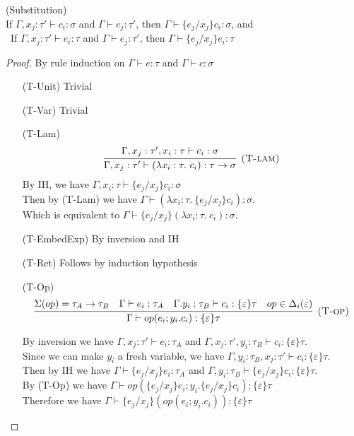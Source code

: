 \begin{lemma} (Substitution) \\
If $\Gamma, x_j : \tau' \vdash c_i : \sigma$ and $\Gamma \vdash e_j : \tau'$, then $\Gamma \vdash \{e_j/x_j\}c_i : \sigma$, and\\\
If $\Gamma, x_j : \tau' \vdash e_i : \tau $ and $\Gamma \vdash e_j : \tau'$, then $\Gamma \vdash \{e_j/x_j\}e_i : \tau$

\begin{proof}
By rule induction on $\Gamma \vdash e : \tau$ and $\Gamma \vdash c : \sigma$
\begin{enumerate}[align=left]
\item[(T-Unit)] Trivial
\item[(T-Var)] Trivial
\item[(T-Lam)] 
$$
\infer[\textsc{(T-lam)}]
  {\Gamma, x_j : \tau'  \vdash (\lambda x_i: \tau.\ c_i) : \tau \rightarrow \sigma}
  {\Gamma,x_j : \tau',  x_i:\tau \vdash c_i : \sigma} 
$$
By IH, we have $\Gamma, x_i:\tau \vdash \{e_j/x_j\}c_i : \sigma$\\
Then by (T-Lam) we have $\Gamma \vdash (\lambda x_i : \tau.\ \{e_j/x_j\}c_i) : \sigma$.\\
Which is equivalent to $\Gamma \vdash \{e_j/x_j\}(\lambda x_i : \tau.\ c_i) : \sigma$.
\item[(T-EmbedExp)] By inversion and IH
\item[(T-Ret)] Follows by induction hypothesis
\item[(T-Op)]  
$$
\infer[\textsc{(T-op)}]
  {\Gamma\vdash op(e_i; y_i.c_i) : \{\varepsilon\}\tau }
  {\Sigma(op) = \tau_A \rightarrow \tau_B & \Gamma \vdash e_i : \tau_A & \Gamma. y_i:\tau_B\vdash c_i: \{\varepsilon\}\tau & op \in \Delta_i(\varepsilon)} 
$$

By inversion we have $\Gamma, x_j : \tau' \vdash e_i : \tau_A$ and $\Gamma, x_j : \tau', y_i : \tau_B \vdash c_i : \{\varepsilon\} \tau$. \\
Since we can make $y_i$ a fresh variable, we have $\Gamma,  y_i : \tau_B, x_j:\tau' \vdash c_i : \{\varepsilon\} \tau$.\\
Then by IH we have $\Gamma \vdash \{e_j/x_j\}e_i : \tau_A$ and $\Gamma,  y_i : \tau_B \vdash \{e_j/x_j\}c_i : \{\varepsilon\} \tau$.\\
By (T-Op) we have $\Gamma \vdash op(\{e_j/x_j\}e_i; y_i.\{e_j/x_j\}c_i) : \{\varepsilon\}\tau$\\
Therefore we have $\Gamma \vdash \{e_j/x_j\}(op(e_i; y_i.c_i)) : \{\varepsilon\}\tau$
\end{enumerate}
\end{proof}
\end{lemma}

